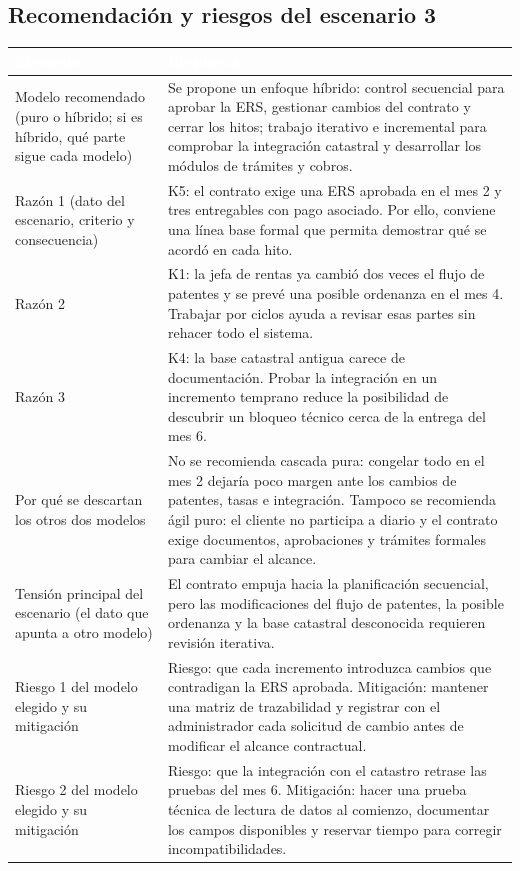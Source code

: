 \subsection{Recomendación y riesgos del escenario 3}

\begin{center}
\small
\begin{tabularx}{\textwidth}{|>{\raggedright\arraybackslash}p{4.5cm}|L|}
\hline
{}
\textcolor{white}{\textbf{Elemento}} & \textcolor{white}{\textbf{Respuesta}} \\ \hline
Modelo recomendado (puro o híbrido; si es híbrido, qué parte sigue cada modelo) &
Se propone un enfoque híbrido: control secuencial para aprobar la ERS, gestionar cambios del contrato y cerrar los hitos; trabajo iterativo e incremental para comprobar la integración catastral y desarrollar los módulos de trámites y cobros. \\ \hline
Razón 1 (dato del escenario, criterio y consecuencia) &
K5: el contrato exige una ERS aprobada en el mes 2 y tres entregables con pago asociado. Por ello, conviene una línea base formal que permita demostrar qué se acordó en cada hito. \\ \hline
Razón 2 &
K1: la jefa de rentas ya cambió dos veces el flujo de patentes y se prevé una posible ordenanza en el mes 4. Trabajar por ciclos ayuda a revisar esas partes sin rehacer todo el sistema. \\ \hline
Razón 3 &
K4: la base catastral antigua carece de documentación. Probar la integración en un incremento temprano reduce la posibilidad de descubrir un bloqueo técnico cerca de la entrega del mes 6. \\ \hline
Por qué se descartan los otros dos modelos &
No se recomienda cascada pura: congelar todo en el mes 2 dejaría poco margen ante los cambios de patentes, tasas e integración. Tampoco se recomienda ágil puro: el cliente no participa a diario y el contrato exige documentos, aprobaciones y trámites formales para cambiar el alcance. \\ \hline
Tensión principal del escenario (el dato que apunta a otro modelo) &
El contrato empuja hacia la planificación secuencial, pero las modificaciones del flujo de patentes, la posible ordenanza y la base catastral desconocida requieren revisión iterativa. \\ \hline
Riesgo 1 del modelo elegido y su mitigación &
Riesgo: que cada incremento introduzca cambios que contradigan la ERS aprobada. Mitigación: mantener una matriz de trazabilidad y registrar con el administrador cada solicitud de cambio antes de modificar el alcance contractual. \\ \hline
Riesgo 2 del modelo elegido y su mitigación &
Riesgo: que la integración con el catastro retrase las pruebas del mes 6. Mitigación: hacer una prueba técnica de lectura de datos al comienzo, documentar los campos disponibles y reservar tiempo para corregir incompatibilidades. \\ \hline
\end{tabularx}
\end{center}
